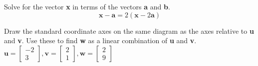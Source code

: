 \documentclass[11pt,letterpaper,boxed]{hmcpset}
\begin{document}
\pagebreak


\begin{problem}[\#17] 
Solve for the vector \textbf{x} in terms of the vectors \textbf{a} and \textbf{b}.\\
\[
\textbf{x} - \textbf{a} = 2(\textbf{x} - 2\textbf{a})
\]
\end{problem}



\pagebreak


\begin{problem}[\#22] 
Draw the standard coordinate axes on the same diagram as the axes relative to \textbf{u} and \textbf{v}. Use these to find \textbf{w} as a linear combination of \textbf{u} and \textbf{v}.\\
$\textbf{u} = \begin{bmatrix} -2 \\ 3 \end{bmatrix},
\textbf{v} = \begin{bmatrix} 2 \\ 1 \end{bmatrix},
\textbf{w} = \begin{bmatrix} 2 \\ 9 \end{bmatrix}$
 
\end{problem}



\pagebreak

\end{document}
